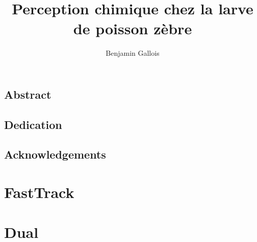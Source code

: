\documentclass[12pt,french]{report}
\title{Perception chimique chez la larve de poisson zèbre}
\author{Benjamin Gallois}
\begin{document}
\maketitle
\chapter*{Abstract}

\chapter*{Dedication}

\chapter*{Acknowledgements}

\tableofcontents

\part{FastTrack}


\part{Dual}




\end{document}
